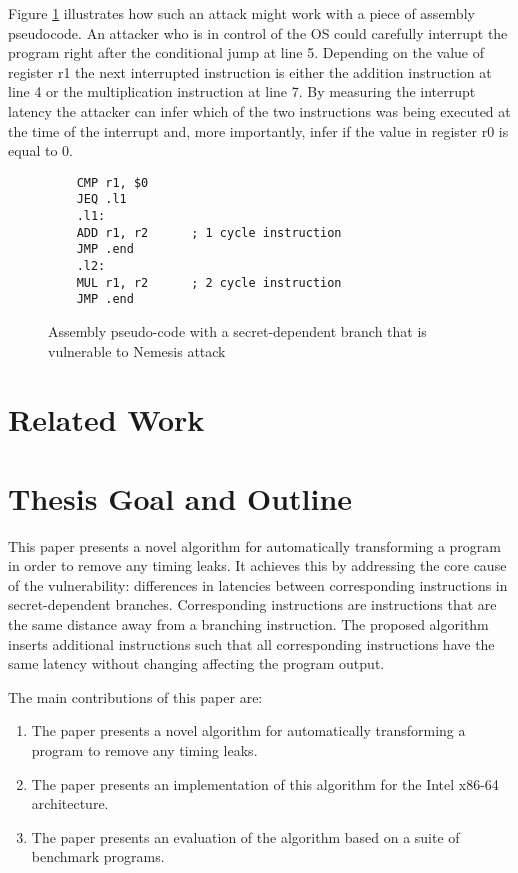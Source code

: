 Figure \ref{fig:pseudo-assembly} illustrates how such an attack might work with a piece of assembly pseudocode. An attacker who is in control of the OS could carefully interrupt the program right
after the conditional jump at line 5. Depending on the value of register r1 the next interrupted instruction is either the addition instruction at line 4 or the multiplication instruction at line 7. 
By measuring the interrupt latency the attacker can infer which of the two instructions was being executed at the time of the interrupt and, more importantly, infer if the value in register r0 is equal to 0. 


\lstset{language=[x64]Assembler, numbers=left, stepnumber=1, frame=single}
\begin{figure}

    \begin{lstlisting}
	CMP r1, $0
	JEQ .l1
	.l1: 
	ADD r1, r2 		; 1 cycle instruction
	JMP .end
	.l2: 
	MUL r1, r2 		; 2 cycle instruction
	JMP .end
	\end{lstlisting}
	\caption{Assembly pseudo-code with a secret-dependent branch that is vulnerable to Nemesis attack}
	\label{fig:pseudo-assembly}
\end{figure}



\section{Related Work}

\section{Thesis Goal and Outline}
This paper presents a novel algorithm for automatically transforming a program in order to remove any timing leaks. It achieves this by addressing the core cause of the vulnerability: differences in 
latencies between corresponding instructions in secret-dependent branches. Corresponding instructions are instructions that are the same distance away from a branching instruction. 
The proposed algorithm inserts additional instructions such that all corresponding instructions have the same latency without changing affecting the program output. 

The main contributions of this paper are:
\begin{enumerate}
\item The paper presents a novel algorithm for automatically transforming a program to remove any timing leaks.
\item The paper presents an implementation of this algorithm for the Intel x86-64 architecture. 
\item The paper presents an evaluation of the algorithm based on a suite of benchmark programs. 
\end{enumerate}

